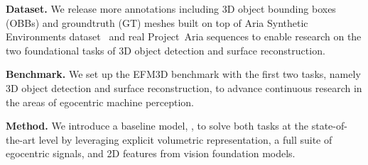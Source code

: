 \noindent \textbf{Dataset.} We release more annotations including 3D object bounding boxes (OBBs) and groundtruth (GT) meshes built on top of Aria Synthetic Environments dataset~\cite{ase2024web} and real Project~Aria sequences to enable research on the two foundational tasks of 3D object detection and surface reconstruction. 

\noindent \textbf{Benchmark.} We set up the EFM3D benchmark with the first two tasks, namely 3D object detection and surface reconstruction, to advance continuous research in the areas of egocentric machine perception.

\noindent \textbf{Method.} We introduce a baseline model, \EFMmodel{}, to solve both tasks at the state-of-the-art level by leveraging explicit volumetric representation, a full suite of egocentric signals, and 2D features from vision foundation models.



